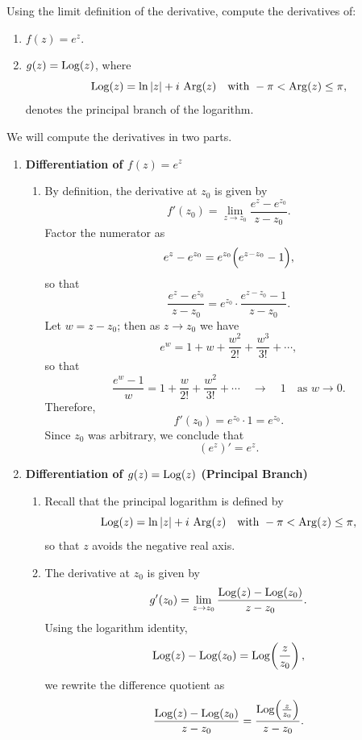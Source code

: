 \exampleline
\begin{example}
Using the limit definition of the derivative, compute the derivatives of:
\begin{enumerate}
    \item \( f(z) = e^z \).
    \item \( g(z) = \operatorname{Log}(z) \), where 
    \[
    \operatorname{Log}(z)=\ln|z|+i\,\operatorname{Arg}(z) \quad \text{with } -\pi < \operatorname{Arg}(z) \le \pi,
    \]
    denotes the principal branch of the logarithm.
\end{enumerate}

\begin{solution}
We will compute the derivatives in two parts.

\begin{enumerate}

\item \textbf{Differentiation of \( f(z)=e^z \)}

\begin{enumerate}
  \item By definition, the derivative at \(z_0\) is given by
  \[
  f'(z_0) = \lim_{z\to z_0} \frac{e^z - e^{z_0}}{z - z_0}.
  \]
  Factor the numerator as
  \[
  e^z - e^{z_0} = e^{z_0}\Bigl(e^{z-z_0}-1\Bigr),
  \]
  so that
  \[
  \frac{e^z - e^{z_0}}{z - z_0} = e^{z_0}\cdot\frac{e^{z-z_0}-1}{z-z_0}.
  \]
  Let \(w = z-z_0\); then as \(z\to z_0\) we have
  \[
  e^w = 1+w+\frac{w^2}{2!}+\frac{w^3}{3!}+\cdots,
  \]
  so that
  \[
  \frac{e^w-1}{w} = 1+\frac{w}{2!}+\frac{w^2}{3!}+\cdots \quad \longrightarrow \quad 1\quad \text{as } w\to 0.
  \]
  Therefore,
  \[
  f'(z_0) = e^{z_0}\cdot 1 = e^{z_0}.
  \]
  Since \(z_0\) was arbitrary, we conclude that
  \[
  (e^z)' = e^z.
  \]
\end{enumerate}

\bigskip

\item \textbf{Differentiation of \( g(z)=\operatorname{Log}(z) \) (Principal Branch)}

\begin{enumerate}
  \item Recall that the principal logarithm is defined by
  \[
  \operatorname{Log}(z)=\ln|z|+i\,\operatorname{Arg}(z) \quad \text{with } -\pi < \operatorname{Arg}(z) \le \pi,
  \]
  so that \(z\) avoids the negative real axis.
  
  \item The derivative at \(z_0\) is given by
  \[
  g'(z_0)=\lim_{z\to z_0}\frac{\operatorname{Log}(z)-\operatorname{Log}(z_0)}{z-z_0}.
  \]
  Using the logarithm identity, 
  \[
  \operatorname{Log}(z)-\operatorname{Log}(z_0)=\operatorname{Log}\!\left(\frac{z}{z_0}\right),
  \]
  we rewrite the difference quotient as
  \[
  \frac{\operatorname{Log}(z)-\operatorname{Log}(z_0)}{z-z_0} = \frac{\operatorname{Log}\!\left(\frac{z}{z_0}\right)}{z-z_0}.
  \]
  

\end{enumerate}
\end{enumerate}
\end{solution}
\end{example}
